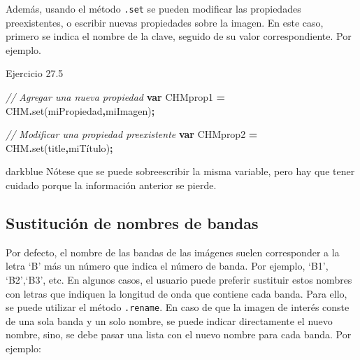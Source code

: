 \documentclass[
  12pt,
  letterpaper,
  twoside]{book}
\newenvironment{Shaded}{\begin{snugshade}}{\end{snugshade}}
\newcommand{\CommentTok}[1]{\textcolor[rgb]{0.56,0.35,0.01}{\textit{#1}}}
\newcommand{\FunctionTok}[1]{\textcolor[rgb]{0.00,0.00,0.00}{#1}}
\newcommand{\KeywordTok}[1]{\textcolor[rgb]{0.13,0.29,0.53}{\textbf{#1}}}
\newcommand{\NormalTok}[1]{#1}
\newcommand{\OperatorTok}[1]{\textcolor[rgb]{0.81,0.36,0.00}{\textbf{#1}}}
\newcommand{\StringTok}[1]{\textcolor[rgb]{0.31,0.60,0.02}{#1}}
\begin{document}
Además, usando el método \texttt{.set} se pueden modificar las propiedades preexistentes, o escribir nuevas propiedades sobre la imagen. En este caso, primero se indica el nombre de la clave, seguido de su valor correspondiente. Por ejemplo.

Ejercicio 27.5

\begin{Shaded}
\begin{Highlighting}[]
\CommentTok{// Agregar una nueva propiedad}
\KeywordTok{var}\NormalTok{ CHMprop1 }\OperatorTok{=}\NormalTok{ CHM}\OperatorTok{.}\FunctionTok{set}\NormalTok{(}\StringTok{\textquotesingle{}miPropiedad\textquotesingle{}}\OperatorTok{,}\StringTok{\textquotesingle{}miImagen\textquotesingle{}}\NormalTok{)}\OperatorTok{;}

\CommentTok{// Modificar una propiedad preexistente}
\KeywordTok{var}\NormalTok{ CHMprop2 }\OperatorTok{=}\NormalTok{ CHM}\OperatorTok{.}\FunctionTok{set}\NormalTok{(}\StringTok{\textquotesingle{}title\textquotesingle{}}\OperatorTok{,}\StringTok{\textquotesingle{}miTítulo\textquotesingle{}}\NormalTok{)}\OperatorTok{;}
\end{Highlighting}
\end{Shaded}

\begin{bluebox2}

\begin{awesomeblock}{5pt}{\faLightbulb}{darkblue}
Nótese que se puede sobreescribir la misma variable, pero hay que tener cuidado porque la información anterior se pierde.

\end{awesomeblock}

\end{bluebox2}

\hypertarget{sustituciuxf3n-de-nombres-de-bandas}{%
\subsection*{Sustitución de nombres de bandas}\label{sustituciuxf3n-de-nombres-de-bandas}}

Por defecto, el nombre de las bandas de las imágenes suelen corresponder a la letra `B' más un número que indica el número de banda. Por ejemplo, `B1', `B2',`B3', etc. En algunos casos, el usuario puede preferir sustituir estos nombres con letras que indiquen la longitud de onda que contiene cada banda. Para ello, se puede utilizar el método \texttt{.rename}. En caso de que la imagen de interés conste de una sola banda y un solo nombre, se puede indicar directamente el nuevo nombre, sino, se debe pasar una lista con el nuevo nombre para cada banda. Por ejemplo:
\end{document}
